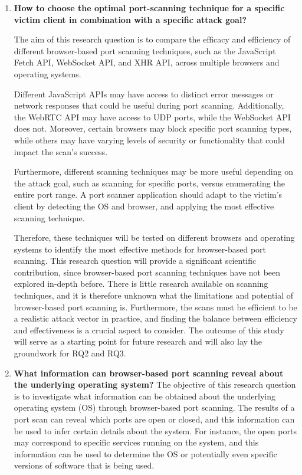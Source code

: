 \begin{enumerate}[RQ1.]

\item \textbf{How to choose the optimal port-scanning technique for a specific victim client in combination with a specific attack goal?}

The aim of this research question is to compare the efficacy and efficiency of different browser-based port scanning techniques, such as the JavaScript Fetch API, WebSocket API, and XHR API, across multiple browsers and operating systems. 

Different JavaScript APIs may have access to distinct error messages or network responses that could be useful during port scanning. Additionally, the WebRTC API may have access to UDP ports, while the WebSocket API does not. Moreover, certain browsers may block specific port scanning types, while others may have varying levels of security or functionality that could impact the scan's success. 

Furthermore, different scanning techniques may be more useful depending on the attack goal, such as scanning for specific ports, versus enumerating the entire port range. A port scanner application should adapt to the victim's client by detecting the OS and browser, and applying the most effective scanning technique.

Therefore, these techniques will be tested on different browsers and operating systems to identify the most effective methods for browser-based port scanning. This research question will provide a significant scientific contribution, since browser-based port scanning techniques have not been explored in-depth before. There is little research available on scanning techniques, and it is therefore unknown what the limitations and potential of browser-based port scanning is. Furthermore, the scans must be efficient to be a realistic attack vector in practice, and finding the balance between efficiency and effectiveness is a crucial aspect to consider. The outcome of this study will serve as a starting point for future research and will also lay the groundwork for RQ2 and RQ3.

\item \textbf{What information can browser-based port scanning reveal about the underlying operating system?}
The objective of this research question is to investigate what information can be obtained about the underlying operating system (OS) through browser-based port scanning. The results of a port scan can reveal which ports are open or closed, and this information can be used to infer certain details about the system. For instance, the open ports may correspond to specific services running on the system, and this information can be used to determine the OS or potentially even specific versions of software that is being used. 


\end{enumerate}
